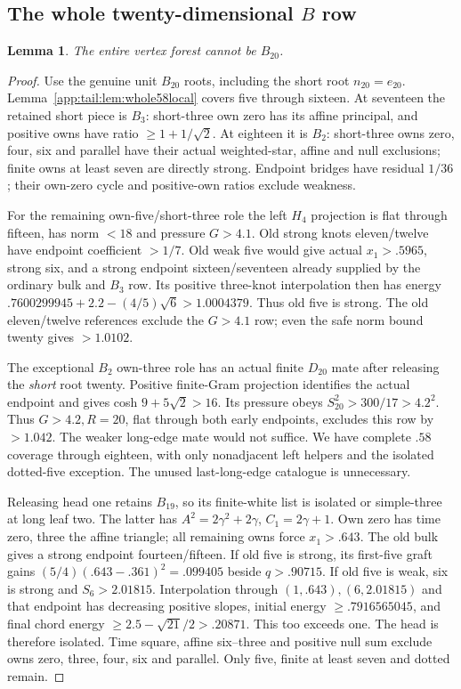 \documentclass[11pt]{article}
\newtheorem{lemma}[theorem]{Lemma}
\theoremstyle{definition}
\theoremstyle{remark}
\begin{document}
\subsection[The whole twenty-dimensional B row]{The whole twenty-dimensional $B$ row}
\begin{lemma}\label{app:tail:lem:wholeB20}
The entire vertex forest cannot be $B_{20}$.
\end{lemma}
\begin{proof}
Use the genuine unit $B_{20}$ roots, including the short root
$n_{20}=e_{20}$. Lemma~\ref{app:tail:lem:whole58local} covers
five through sixteen. At seventeen the retained short piece is
$B_3$: short-three own zero has its affine principal, and positive
owns have ratio $\ge1+1/\sqrt2$. At eighteen it is $B_2$:
short-three owns zero, four, six and parallel have their actual
weighted-star, affine and null exclusions; finite owns at least
seven are directly strong. Endpoint bridges have residual $1/36$;
their own-zero cycle and positive-own ratios exclude weakness.

For the remaining own-five/short-three role the left $H_4$
projection is flat through fifteen, has norm $<18$ and pressure
$G>4.1$. Old strong knots eleven/twelve have endpoint coefficient
$>1/7$. Old weak five would give actual $x_1>.5965$, strong six,
and a strong endpoint sixteen/seventeen already supplied by the
ordinary bulk and $B_3$ row. Its positive three-knot interpolation
then has energy
$.7600299945+2.2-(4/5)\sqrt6>1.0004379$.
Thus old five is strong. The old eleven/twelve references exclude
the $G>4.1$ row; even the safe norm bound twenty gives $>1.0102$.

The exceptional $B_2$ own-three role has an actual finite $D_{20}$
mate after releasing the \emph{short} root twenty. Positive
finite-Gram projection identifies the actual endpoint and gives
cosh $9+5\sqrt2>16$. Its pressure obeys
$S_{20}^2>300/17>4.2^2$. Thus $G>4.2,R=20$, flat through
both early endpoints, excludes this row by $>1.042$.
The weaker long-edge mate would not suffice.
We have complete $.58$ coverage through eighteen, with only
nonadjacent left helpers and the isolated dotted-five exception.
The unused last-long-edge catalogue is unnecessary.

Releasing head one retains $B_{19}$, so its finite-white list is
isolated or simple-three at long leaf two. The latter has
$A^2=2\gamma^2+2\gamma$, $C_1=2\gamma+1$.
Own zero has time zero, three the affine triangle; all remaining
owns force $x_1>.643$.
The old bulk gives a strong endpoint fourteen/fifteen. If old
five is strong, its first-five graft gains
$(5/4)(.643-.361)^2=.099405$ beside $q>.90715$.
If old five is weak, six is strong and $S_6>2.01815$.
Interpolation through $(1,.643),(6,2.01815)$ and that endpoint
has decreasing positive slopes, initial energy $\ge.7916565045$,
and final chord energy $\ge2.5-\sqrt{21}/2>.20871$.
This too exceeds one. The head is therefore isolated.
Time square, affine six--three and positive null sum exclude
owns zero, three, four, six and parallel. Only five, finite
at least seven and dotted remain.


\end{proof}
\end{document}
